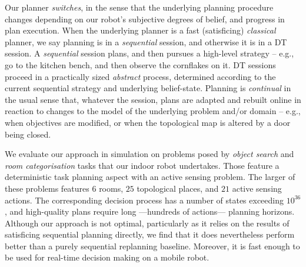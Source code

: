 Our planner {\em switches}, in the sense that the underlying planning
procedure changes depending on our robot's subjective degrees of
belief, and progress in plan execution. When the underlying planner is
a fast (satisficing) {\em classical} planner, we say planning is in a
{\em sequential} session, and otherwise it is in a DT session.
A {\em sequential} session plans, and then pursues a high-level
strategy -- e.g., go to the kitchen bench, and then observe the
cornflakes on it.
DT sessions proceed in a practically sized {\em abstract} process,
determined according to the current sequential strategy and underlying
belief-state.
Planning is {\em continual} in the usual sense that, whatever the
session, plans are adapted and rebuilt online in reaction to changes
to the model of the underlying problem and/or domain -- e.g., when
objectives are modified, or when the topological map is altered by a
door being closed.






We evaluate our approach in simulation on problems posed by {\em
object search} and {\em room categorisation} tasks that our indoor
robot undertakes. Those feature a deterministic task planning aspect
with an active sensing problem. The larger of these problems features
$6$ rooms, $25$ topological places, and $21$ active sensing
actions. The corresponding decision process has a number of states
exceeding $10^{36}$, and high-quality plans require long ---hundreds
of actions--- planning horizons.
Although our approach is not optimal, particularly as it relies on the
results of satisficing sequential planning directly, we find that it
does nevertheless perform better than a purely sequential replanning
baseline. Moreover, it is fast enough to be used for real-time
decision making on a mobile robot.


